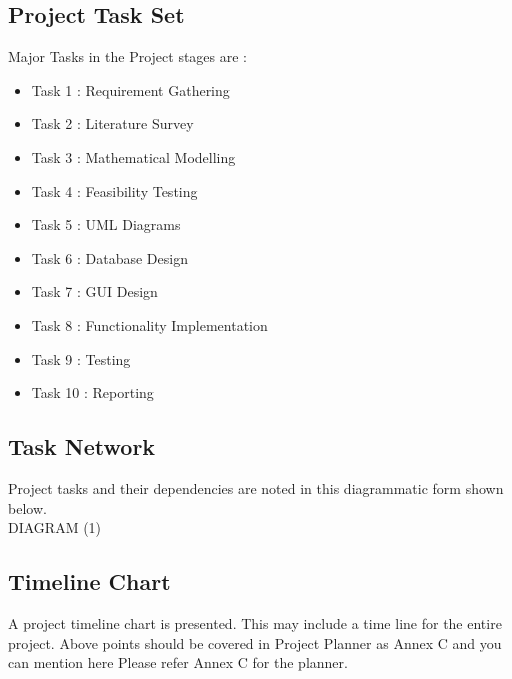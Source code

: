 \documentclass{report} %
\begin{document}
			\subsection{Project Task Set}
			Major Tasks in the Project stages are : 
				\begin{itemize}
					\item Task 1 : Requirement Gathering 
					\item Task 2 : Literature Survey
					\item Task 3 : Mathematical Modelling
					\item Task 4 : Feasibility Testing
					\item Task 5 : UML Diagrams
					\item Task 6 : Database Design
					\item Task 7 : GUI Design
					\item Task 8 : Functionality Implementation
					\item Task 9 : Testing
					\item Task 10 : Reporting
				\end{itemize}
			
			\subsection{Task Network}
			Project tasks and their dependencies are noted in this diagrammatic form shown below. \\
			
			DIAGRAM (1)
			
			\subsection{Timeline Chart}
			A project timeline chart is presented. This may include a time line for the entire project. Above points should be covered in Project Planner as Annex C and you can	mention here Please refer Annex C for the planner.
			
\end{document}
